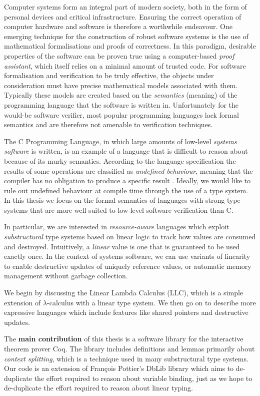 \documentclass[]{unswthesis}
\newcommand{\Francois}{Fran\frenchc{c}ois }
\let\frenchc\c
\let\c\texttt
\let\i\textit
\let\b\textbf
\begin{document}
Computer systems form an integral part of modern society, both in the form of personal devices and critical infrastructure. Ensuring the correct operation of computer hardware and software is therefore a worthwhile endeavour. One emerging technique for the construction of robust software systems is the use of mathematical formalisations and proofs of correctness. In this paradigm, desirable properties of the software can be proven true using a computer-based \i{proof assistant}, which itself relies on a minimal amount of trusted code. For software formalisation and verification to be truly effective, the objects under consideration must have precise mathematical models associated with them. Typically these models are created based on the \i{semantics} (meaning) of the programming language that the software is written in. Unfortunately for the would-be software verifier, most popular programming languages lack formal semantics and are therefore not amenable to verification techniques.

The C Programming Language, in which large amounts of low-level \i{systems software} is written, is an example of a language that is difficult to reason about because of its murky semantics. According to the language specification the results of some operations are classified as \i{undefined behaviour}, meaning that the compiler has no obligation to produce a specific result \cite{isoc}. Ideally, we would like to rule out undefined behaviour at compile time through the use of a type system. In this thesis we focus on the formal semantics of languages with strong type systems that are more well-suited to low-level software verification than C.

In particular, we are interested in \i{resource-aware} languages which exploit \i{substructural} type systems based on linear logic \cite{girard87} to track how values are consumed and destroyed. Intuitively, a \i{linear} value is one that is guaranteed to be used exactly once. In the context of systems software, we can use variants of linearity to enable destructive updates of uniquely reference values, or automatic memory management without garbage collection.

We begin by discussing the Linear Lambda Calculus (LLC), which is a simple extension of $\lambda$-calculus with a linear type system. We then go on to describe more expressive languages which include features like shared pointers and destructive updates.

The \b{main contribution} of this thesis is a software library for the interactive theorem prover Coq. The library includes definitions and lemmas primarily about \i{context splitting}, which is a technique used in many substructural type systems. Our code is an extension of \Francois Pottier's DbLib library which aims to de-duplicate the effort required to reason about variable binding, just as we hope to de-duplicate the effort required to reason about linear typing.
\end{document}
